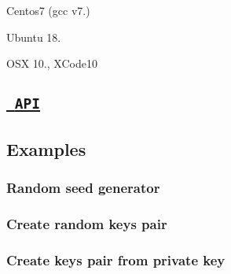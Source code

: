 \begin{DoxyEnumerate}
\item Centos7 (gcc v7.)
\end{DoxyEnumerate}
\begin{DoxyEnumerate}
\item Ubuntu 18.
\end{DoxyEnumerate}
\begin{DoxyEnumerate}
\item O\+SX 10., X\+Code10
\end{DoxyEnumerate}

\subsection*{\href{https://htmlpreview.github.io/?https://github.com/dnevera/ed25519cpp/blob/master/docs/html/namespaces.html}{\texttt{ A\+PI}}}

\subsection*{Examples}

\subsubsection*{Random seed generator}


\begin{DoxyCode}{0}
\DoxyCodeLine{}
\DoxyCodeLine{}
\end{DoxyCode}


\subsubsection*{Create random keys pair}


\begin{DoxyCode}{0}
\DoxyCodeLine{}
\DoxyCodeLine{\}}
\end{DoxyCode}


\subsubsection*{Create keys pair from private key}


